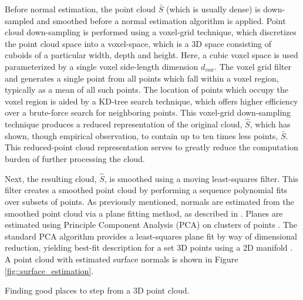 			Before normal estimation, the point cloud $\bar{S}$ (which is usually dense) is down-sampled and smoothed before a normal estimation algorithm is applied. Point cloud down-sampling is performed using a voxel-grid technique, which discretizes the point cloud space into a voxel-space, which is a 3D space consisting of cuboids of a particular width, depth and height. Here, a cubic voxel space is used parameterized by a single voxel side-length dimension $d_{vox}$. The voxel grid filter and generates a single point from all points which fall within a voxel region, typically as a mean of all such points. The location of points which occupy the voxel region is aided by a KD-tree search technique, which offers higher efficiency over a brute-force search for neighboring points. This voxel-grid down-sampling technique produces a reduced representation of the original cloud, $\hat{S}$, which has shown, though empirical observation, to contain up to ten times less points, $\bar{S}$. This reduced-point cloud representation serves to greatly reduce the computation burden of further processing the cloud.

			Next, the resulting cloud, $\hat{S}$, is smoothed using a moving least-squares filter. This filter creates a smoothed point cloud by performing a sequence polynomial fits over subsets of points. As previously mentioned, normals are estimated from the smoothed point cloud via a plane fitting method, as described in \cite{Mitra2003}. Planes are estimated using Principle Component Analysis (PCA) on clusters of points \cite{Castillo2013}. The standard PCA algorithm provides a least-squares plane fit by way of dimensional reduction, yielding best-fit description for a set 3D points using a 2D manifold \cite{Pearson1901}. A point cloud with estimated surface normals is shown in Figure \ref{fig::surface_estimation}.
			\begin{algorithm}[!h]
				\begin{algorithmic}
						\EndIf
					\EndFor
				\end{algorithmic}	
				\caption{Finding good places to step from a 3D point cloud.}
				\label{alg::goodspacestostep}
			\end{algorithm}

